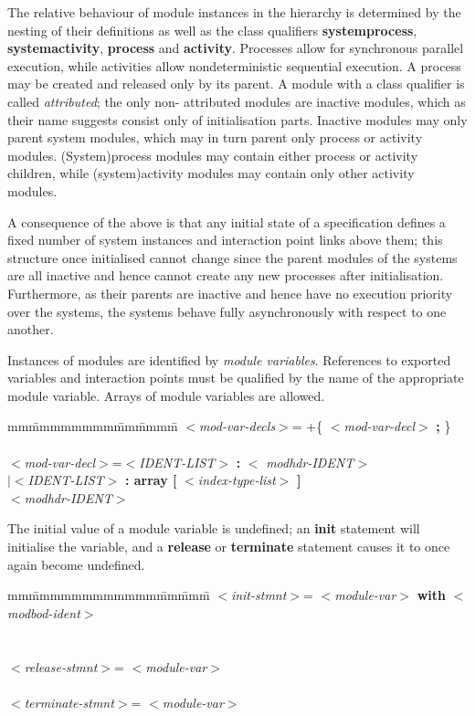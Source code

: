 The relative behaviour of module instances in the
hierarchy is determined by the nesting of their definitions
as well as the class qualifiers {\bf systemprocess},
{\bf systemactivity}, {\bf process} and {\bf activity}. Processes allow for
synchronous parallel execution, while activities allow
nondeterministic sequential execution. A process may be
created and released only by its parent. A module with a
class qualifier is called {\em attributed}; the only non-
attributed modules are inactive modules, which as their name
suggests consist only of initialisation parts. Inactive
modules may only parent system modules, which may in turn
parent only process or activity modules. (System)process
modules may contain either process or activity children,
while (system)activity modules may contain only other
activity modules.

A consequence of the above is that any initial state of a
specification defines a fixed number of system instances and
interaction point links above them; this structure once
initialised cannot change since the parent modules of the
systems are all inactive and hence cannot create any new
processes after initialisation. Furthermore, as their
parents are inactive and hence have no execution priority
over the systems, the systems behave fully asynchronously
with respect to one another.

Instances of modules are identified by {\em module variables}.
References to exported variables and interaction points must
be qualified by the name of the appropriate module variable.
Arrays of module variables are allowed.

\begin{tabbing}
mm\=mmmmmmmm\=mm\=mmmm\=\+\kill
$<${\em mod-var-decls}$>$=\> +\{ $<${\em mod-var-decl}$>$ {\bf
;} \}\\
\mbox{}\\
$<${\em mod-var-decl}$>$\>=\>$<${\em IDENT-LIST}$>$ {\bf :} $<${\em
modhdr-IDENT}$>$\\
\>\>$|<${\em IDENT-LIST}$>$ {\bf : array [} $<${\em index-type-list}$>$ {\bf
]}\\
\>\> $<${\em modhdr-IDENT}$>$\\
\end{tabbing}

The initial value of a module variable is undefined; an
{\bf init} statement will initialise the variable, and a {\bf
release} or {\bf terminate} statement causes it to once 
again become undefined.

\begin{tabbing}
mm\=mmmmmmmmmmmm\=mm\=mmm\=\+\kill
$<${\em init-stmnt}$>$\>= $<${\em module-var}$>$ {\bf with} $<${\em
modbod-ident}$>$\\
\>\>\\
\mbox{}\\
$<${\em release-stmnt}$>$\>= $<${\em module-var}$>$\\
\mbox{}\\
$<${\em terminate-stmnt}$>$\>= $<${\em module-var}$>$
\end{tabbing}

